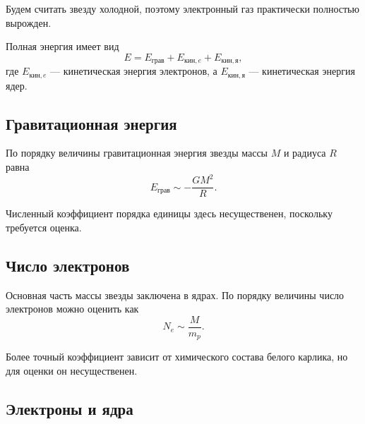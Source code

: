 \documentclass[../final.tex]{subfiles}
\begin{document}
Будем считать звезду холодной, поэтому электронный газ практически
полностью вырожден.

Полная энергия имеет вид
%
\begin{equation*}
    E
    =
    E_{\text{грав}}
    +
    E_{\text{кин},e}
    +
    E_{\text{кин},я},
\end{equation*}
%
где $E_{\text{кин},e}$ --- кинетическая энергия электронов,
а $E_{\text{кин},я}$ --- кинетическая энергия ядер.



\subsection*{Гравитационная энергия}

По порядку величины гравитационная энергия звезды массы $M$
и радиуса $R$ равна
%
\begin{equation*}
    E_{\text{грав}}
    \sim
    -\frac{GM^2}{R}.
\end{equation*}

Численный коэффициент порядка единицы здесь несущественен,
поскольку требуется оценка.



\subsection*{Число электронов}

Основная часть массы звезды заключена в ядрах.
По порядку величины число электронов можно оценить как
%
\begin{equation*}
    N_e
    \sim
    \frac{M}{m_p}.
\end{equation*}

Более точный коэффициент зависит от химического состава белого карлика,
но для оценки он несущественен.



\subsection*{Электроны и ядра}
\end{document}
